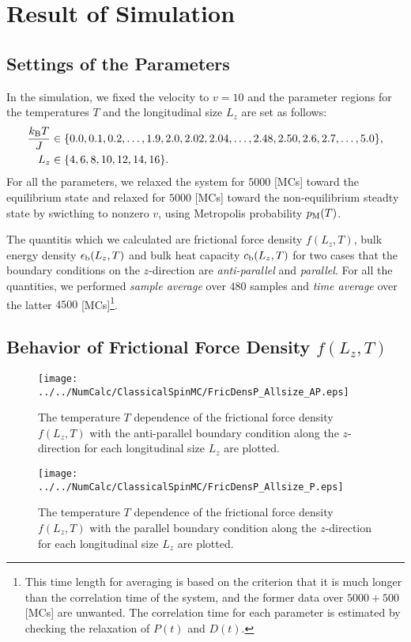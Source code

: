 \chapter{Result of Simulation}

\section{Settings of the Parameters}

In the simulation, we fixed the velocity to $v=10$ and the parameter regions for the temperatures $T$ and the longitudinal size $L_{z}$ are set as follows:
\begin{align}
\frac{k_{\rm B}T}{J}&\in\{0.0,0.1,0.2,\dots,1.9,2.0,2.02,2.04,\dots,2.48,2.50,2.6,2.7,\dots,5.0\},\\
L_{z}&\in\{4,6,8,10,12,14,16\}.
\end{align}
For all the parameters, we relaxed the system for $5000$ [MCs] toward the equilibrium state and relaxed for $5000$ [MCs] toward the non-equilibrium steadty state by swicthing to nonzero $v$, using Metropolis probability $p_{\rm M}(T)$.

The quantitis which we calculated are frictional force density $f(L_{z}, T)$, bulk energy density $\epsilon_{\rm b}(L_{z}, T)$ and bulk heat capacity $c_{\rm b}(L_{z}, T)$ for two cases that the boundary conditions on the $z$-direction are \textit{anti-parallel} and \textit{parallel}. For all the quantities, we performed \textit{sample average} over $480$ samples and \textit{time average} over the latter $4500$ [MCs]\footnote{This time length for averaging is based on the criterion that it is much longer than the correlation time of the system, and the former data over $5000 + 500$ [MCs] are unwanted. The correlation time for each parameter is estimated by checking the relaxation of $P(t)$ and $D(t)$.}. 

\section{Behavior of Frictional Force Density $f(L_{z}, T)$}
\begin{figure}[htbp]
	\centering
	\texttt{[image: ../../NumCalc/ClassicalSpinMC/FricDensP\_Allsize\_AP.eps]}
	\caption{The temperature $T$ dependence of the frictional force density $f(L_{z}, T)$ with the anti-parallel boundary condition along the $z$-direction for each longitudinal size $L_{z}$ are plotted.}
\end{figure}
\begin{figure}[htbp]
	\centering
	\texttt{[image: ../../NumCalc/ClassicalSpinMC/FricDensP\_Allsize\_P.eps]}
	\caption{The temperature $T$ dependence of the frictional force density $f(L_{z}, T)$ with the parallel boundary condition along the $z$-direction for each longitudinal size $L_{z}$ are plotted.}
\end{figure}
\pagebreak

